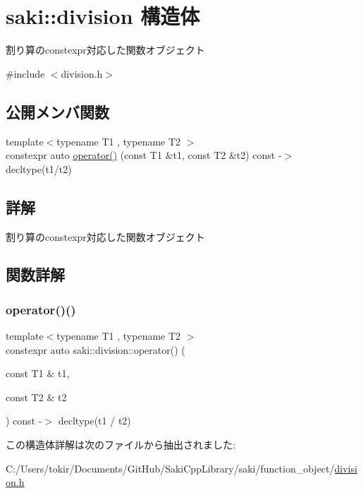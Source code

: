 \hypertarget{structsaki_1_1division}{}\section{saki\+:\+:division 構造体}
\label{structsaki_1_1division}


割り算のconstexpr対応した関数オブジェクト  




{\ttfamily \#include $<$division.\+h$>$}

\subsection*{公開メンバ関数}
\begin{DoxyCompactItemize}
\item 
{\footnotesize template$<$typename T1 , typename T2 $>$ }\\constexpr auto \mbox{\hyperlink{structsaki_1_1division_a54652339884419a0b696265b17b32705}{operator()}} (const T1 \&t1, const T2 \&t2) const -\/$>$ decltype(t1/t2)
\end{DoxyCompactItemize}


\subsection{詳解}
割り算のconstexpr対応した関数オブジェクト 

\subsection{関数詳解}
\mbox{\label{structsaki_1_1division_a54652339884419a0b696265b17b32705}} 
\subsubsection{\texorpdfstring{operator()()}{operator()()}}
{\footnotesize\ttfamily template$<$typename T1 , typename T2 $>$ \\
constexpr auto saki\+::division\+::operator() (\begin{DoxyParamCaption}\item[{const T1 \&}]{t1,  }\item[{const T2 \&}]{t2 }\end{DoxyParamCaption}) const -\/$>$ decltype(t1 / t2)
		\hspace{0.3cm}{\ttfamily [inline]}}



この構造体詳解は次のファイルから抽出されました\+:\begin{DoxyCompactItemize}
\item 
C\+:/\+Users/tokir/\+Documents/\+Git\+Hub/\+Saki\+Cpp\+Library/saki/function\+\_\+object/\mbox{\hyperlink{division_8h}{division.\+h}}\end{DoxyCompactItemize}
